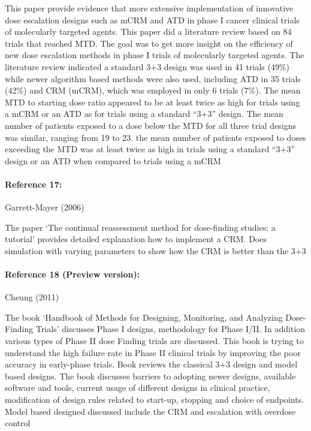\documentclass[
]{article}
\begin{document}
This paper provide evidence that more extensive implementation of
innovative dose escalation designs such as mCRM and ATD in phase I
cancer clinical trials of molecularly targeted agents. This paper did a
literature review based on 84 trials that reached MTD. The goal was to
get more insight on the efficiency of new dose escalation methods in
phase I trials of molecularly targeted agents. The literature review
indicated a standard 3+3 design was used in 41 trials (49\%) while newer
algorithm based methods were also used, including ATD in 35 trials
(42\%) and CRM (mCRM), which was employed in only 6 trials (7\%). The
mean MTD to starting dose ratio appeared to be at least twice as high
for trials using a mCRM or an ATD as for trials using a standard ``3+3''
design. The mean number of patients exposed to a dose below the MTD for
all three trial designs was similar, ranging from 19 to 23. the mean
number of patients exposed to doses exceeding the MTD was at least twice
as high in trials using a standard ``3+3'' design or an ATD when
compared to trials using a mCRM

\hypertarget{reference-17}{%
\paragraph{Reference 17:}\label{reference-17}}

Garrett-Mayer (2006)

The paper `The continual reassessment method for dose-finding studies: a
tutorial' provides detailed explanation how to implement a CRM. Does
simulation with varying parameters to show how the CRM is better than
the 3+3

\hypertarget{reference-18-preview-version}{%
\paragraph{Reference 18 (Preview
version):}\label{reference-18-preview-version}}

Cheung (2011)

The book `Handbook of Methods for Designing, Monitoring, and Analyzing
Dose-Finding Trials' discusses Phase I designs, methodology for Phase
I/II. In addition various types of Phase II dose Finding trials are
discussed. This book is trying to understand the high failure rate in
Phase II clinical trials by improving the poor accuracy in early-phase
trials. Book reviews the classical 3+3 design and model based designs.
The book discusses barriers to adopting newer designs, available
software and tools, current usage of different designs in clinical
practice, modification of design rules related to start-up, stopping and
choice of endpoints. Model based designed discussed include the CRM and
escalation with overdose control
\end{document}
